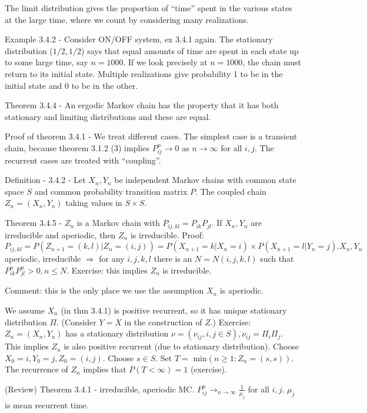 \documentclass{article}
\begin{document}
The limit distribution gives the proportion of ``time'' spent in the various states at the large time, where we count by considering many realizations.

Example 3.4.2 - Consider ON/OFF system, ex 3.4.1 again. The stationary distribution ($1/2, 1/2$) says that equal amounts of time are spent in each state up to some large time, say $n = 1000$. If we look precisely at $n = 1000$, the chain must return to its initial state. Multiple realizations give probability 1 to be in the initial state and 0 to be in the other.

Theorem 3.4.4 - An ergodic Markov chain has the property that it has both stationary and limiting distributions and these are equal.

Proof of theorem 3.4.1 - We treat different cases. The simplest case is a transient chain, because theorem 3.1.2 (3) implies $P_{ij}^n \rightarrow 0$ as $n \rightarrow \infty$ for all $i, j$. The recurrent cases are treated with ``coupling''.

Definition - 3.4.2 - Let $X_n, Y_n$ be independent Markov chains with common state space $S$ and common probability transition matrix $P$. The coupled chain $Z_n = (X_n, Y_n)$ taking values in $S \times S$.

Theorem 3.4.5 - $Z_n$ is a Markov chain with $P_{ij, kl} = P_{ik}P_{jl}$. If $X_n, Y_n$ are irreducible and aperiodic, then $Z_n$ is irreducible. Proof: $P_{ij, kl} = P(Z_{n+1} = (k, l) | Z_n = (i, j)) = P(X_{n+1} = k | X_n=i) \times P(X_{n+1} = l | Y_n = j). X_n, Y_n$ aperiodic, irreducible $\Rightarrow$ for any $i, j, k, l$ there is an $N = N(i, j, k, l)$ such that $P_{ik}^n P_{jl}^n > 0, n \le N$. Exercise: this implies $Z_n$ is irreducible.

Comment: this is the only place we use the assumption $X_n$ is aperiodic.

We assume $X_n$ (in thm 3.4.1) is positive recurrent, so it has unique stationary distribution $\Pi$. (Consider $Y = X$ in the construction of $Z$.) Exercise: $Z_n = (X_n, Y_n)$ has a stationary distribution $\nu = (\nu_{ij}, i, j \in S), \nu_{ij} = \Pi_i \Pi_j$. This implies $Z_n$ is also positive recurrent (due to stationary distribution). Choose $X_0 = i, Y_0 = j, Z_0 = (i, j)$. Choose $s \in S$. Set $T =$ min$(n \ge 1: Z_n = (s, s))$. The recurrence of $Z_n$ implies that $P(T < \infty) = 1$ (exercise).

(Review) Theorem 3.4.1 - irreducible, aperiodic MC. $P_{ij}^n \rightarrow_{n \rightarrow \infty} \frac{1}{\mu_j}$ for all $i, j$. $\mu_j$ is mean recurrent time.
\end{document}
